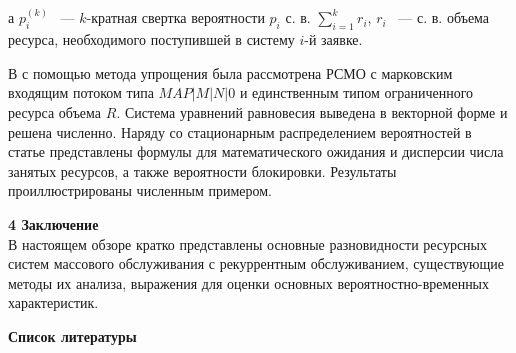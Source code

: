 \documentclass[a4paper,12pt]{article}
\begin{document}
а $p^{(k)}_i$ ~--- $k$-кратная свертка вероятности $p_i$ с. в. $\sum_{i=1}^{k}r_i$, $r_i$ ~--- с. в. объема ресурса, необходимого поступившей в систему $i$-й заявке.



В \cite{Sopin_17_2018} с помощью метода упрощения была рассмотрена РСМО с марковским входящим потоком типа $MAP|M|N|0$ и единственным типом ограниченного ресурса объема $R$. Система уравнений равновесия выведена в векторной форме и решена численно. Наряду со стационарным распределением вероятностей в статье представлены формулы для математического ожидания и дисперсии числа занятых ресурсов, а также вероятности блокировки. Результаты проиллюстрированы численным примером.



\vspace{\baselineskip}     %




\noindent

\textbf{4 Заключение}\\

В настоящем обзоре кратко представлены основные разновидности ресурсных систем массового обслуживания с рекуррентным обслуживанием, существующие методы их анализа, выражения для оценки основных вероятностно-временных характеристик.



\vspace{\baselineskip}     %



\noindent\textbf{Список литературы}
\end{document}
